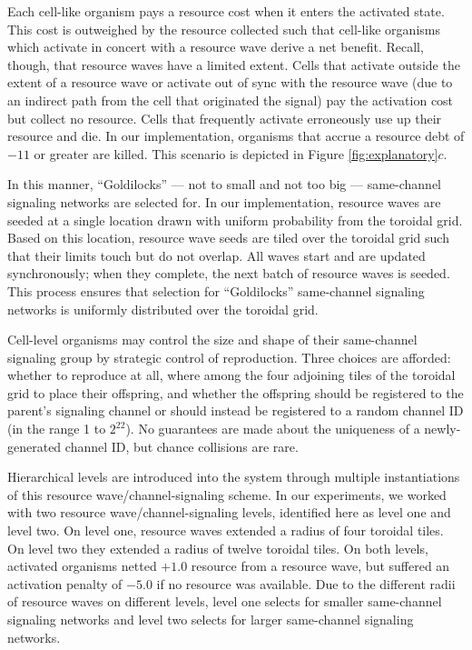 Each cell-like organism pays a resource cost when it enters the activated state.
This cost is outweighed by the resource collected such that cell-like organisms which activate in concert with a resource wave derive a net benefit.
Recall, though, that resource waves have a limited extent.
Cells that activate outside the extent of a resource wave or activate out of sync with the resource wave (due to an indirect path from the cell that originated the signal) pay the activation cost but collect no resource.
Cells that frequently activate erroneously use up their resource and die.
In our implementation, organisms that accrue a resource debt of $-11$ or greater are killed.
This scenario is depicted in Figure \ref{fig:explanatory}$c$.

In this manner, ``Goldilocks'' --- not to small and not too big --- same-channel signaling networks are selected for.
In our implementation, resource waves are seeded at a single location drawn  with uniform probability from the toroidal grid.
Based on this location, resource wave seeds are tiled over the toroidal grid such that their limits touch but do not overlap.
All waves start and are updated synchronously;
when they complete, the next batch of resource waves is seeded.
This process ensures that selection for ``Goldilocks'' same-channel signaling networks is uniformly distributed over the toroidal grid.

Cell-level organisms may control the size and shape of their same-channel signaling group by strategic control of reproduction.
Three choices are afforded: whether to reproduce at all, where among the four adjoining tiles of the toroidal grid to place their offspring, and whether the offspring should be registered to the parent's signaling channel or should instead be registered to a random channel ID (in the range 1 to $2^{22}$).
No guarantees are made about the uniqueness of a newly-generated channel ID, but chance collisions are rare.

Hierarchical levels are introduced into the system through multiple instantiations of this resource wave/channel-signaling scheme.
In our experiments, we worked with two resource wave/channel-signaling levels, identified here as level one and level two.
On level one, resource waves extended a radius of four toroidal tiles.
On level two they extended a radius of twelve toroidal tiles.
On both levels, activated organisms netted $+1.0$ resource from a resource wave, but suffered an activation penalty of $-5.0$ if no resource was available.
Due to the different radii of resource waves on different levels, level one selects for smaller same-channel signaling networks and level two selects for larger same-channel signaling networks.

